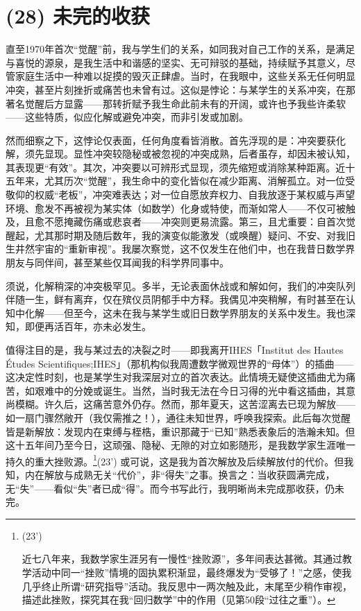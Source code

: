 \section{(28) 未完的收获}

直至1970年首次“觉醒”前，我与学生们的关系，如同我对自己工作的关系，是满足与喜悦的源泉，是我生活中和谐感的坚实、无可辩驳的基础，持续赋予其意义，尽管家庭生活中一种难以捉摸的毁灭正肆虐。当时，在我眼中，这些关系无任何明显冲突，甚至片刻挫折或痛苦也未曾有过。这似是悖论：与某学生的关系冲突，在那著名觉醒后方显露——那转折赋予我生命此前未有的开阔，或许也予我些许柔软——这些特质，似应化解或避免冲突，而非引发或加剧。

然而细察之下，这悖论仅表面，任何角度看皆消散。首先浮现的是：冲突要获化解，须先显现。显性冲突较隐秘或被忽视的冲突成熟，后者虽存，却因未被认知，其表现更“有效”。其次，冲突要以可辨形式显现，须先缩短或消除某种距离。近十五年来，尤其历次“觉醒”，我生命中的变化皆似在减少距离、消解孤立。对一位受敬仰的权威“老板”，冲突难表达；对一位自愿放弃权力、自我放逐于某权威与声望环境、愈发不再被视为某实体（如数学）化身或特使，而渐如常人——不仅可被触及，且愈不愿掩藏伤痛或悲哀者——冲突则更易流露。第三，且尤重要：自首次觉醒起，尤其那时期及随后数年，我的演变似能激发（或唤醒）疑问、不安、对我旧生井然宇宙的“重新审视”。我屡次察觉，这不仅发生在他们中，也在我昔日数学界朋友与同伴间，甚至某些仅耳闻我的科学界同事中。

须说，化解稍深的冲突极罕见。多半，无论表面休战或和解如何，我们的冲突队列伴随一生，鲜有离弃，仅在殡仪员阴郁手中方释。我偶见冲突稍解，有时甚至在认知中化解——但至今，这未在我与某学生或旧日数学界朋友的关系中发生。我也深知，即便再活百年，亦未必发生。

值得注目的是，我与某过去的决裂之时——即我离开IHES「Institut des Hautes Études Scientifiques;IHES」（那机构似我周遭数学微观世界的“母体”）的插曲——这决定性时刻，也是某学生对我深层对立的首次表达。此情境无疑使这插曲尤为痛苦，如艰难中的分娩或诞生。当然，当时我无法在今日习得的光中看这插曲，其意尚模糊。许久后，这痛苦意外仍存。然而，那年夏天，这苦涩离去已现为解放——如一扇门骤然敞开（我仅需推之！），通往未知世界，呼唤我探索。此后每次觉醒皆是新解放：发现内在束缚与桎梏，重识那藏于“已知”熟悉表象后的浩瀚未知。但这十五年间乃至今日，这顽强、隐秘、无隙的对立如影随形，是我数学家生涯唯一持久的重大挫败源。\footnote{(23’)\par 近七八年来，我数学家生涯另有一慢性“挫败源”，多年间表达甚微。其通过教学活动中同一“挫败”情境的固执累积渐显，最终爆发为“受够了！”之感，使我几乎终止所谓“研究指导”活动。我反思中一两次触及此，末尾至少稍作审视，描述此挫败，探究其在我“回归数学”中的作用（见第50段“过往之重”）。}(23’) 或可说，这是我为首次解放及后续解放付的代价。但我知，内在解放与成熟无关“代价”，非“得失”之事。换言之：当收获圆满完成，无“失”——看似“失”者已成“得”。而今书写此行，我明晰尚未完成那收获，仍未完。